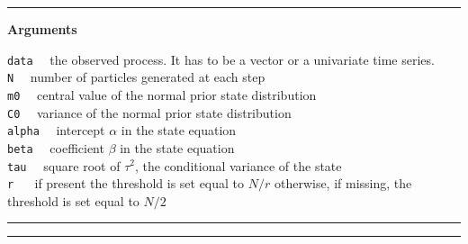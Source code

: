 \documentclass[
]{book}
\theoremstyle{break}
\theoremstyle{nonumberplain}
\begin{document}
\hrule

\textbf{Arguments}

\texttt{data} ~~the observed process. It has to be a vector or a
univariate time series.\\
\texttt{N} ~~number of particles generated at each step\\
\texttt{m0} ~~central value of the normal prior state distribution\\
\texttt{C0} ~~variance of the normal prior state distribution\\
\texttt{alpha} ~~intercept \(\alpha\) in the state equation\\
\texttt{beta} ~~coefficient \(\beta\) in the state equation\\
\texttt{tau} ~~square root of \(\tau^2\), the conditional variance of
the state\\
\texttt{r} ~~ if present the threshold is set equal to \(N/r\)
otherwise, if missing, the threshold is set equal to \(N/2\)

\hrule
\hrule
\end{document}
